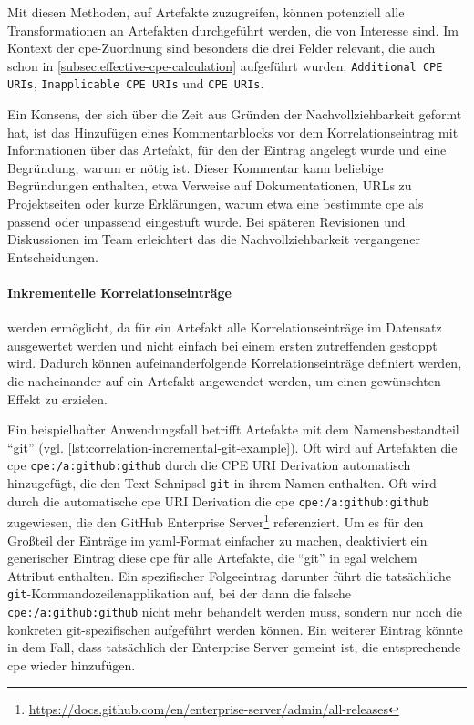 \bigskip

Mit diesen Methoden, auf Artefakte zuzugreifen, können potenziell alle Transformationen an Artefakten durchgeführt werden, die von Interesse sind.
Im Kontext der \acrshort{cpe}-Zuordnung sind besonders die drei Felder relevant, die auch schon in \autoref{subsec:effective-cpe-calculation} aufgeführt wurden:
\texttt{Additional CPE URIs}, \texttt{Inapplicable CPE URIs} und \texttt{CPE URIs}.

Ein Konsens, der sich über die Zeit aus Gründen der Nachvollziehbarkeit geformt hat, ist das Hinzufügen eines Kommentarblocks vor dem Korrelationseintrag mit Informationen über das Artefakt, für den der Eintrag angelegt wurde und eine Begründung, warum er nötig ist.
Dieser Kommentar kann beliebige Begründungen enthalten, etwa Verweise auf Dokumentationen, URLs zu Projektseiten oder kurze Erklärungen, warum etwa eine bestimmte \acrshort{cpe} als passend oder unpassend eingestuft wurde.
Bei späteren Revisionen und Diskussionen im Team erleichtert das die Nachvollziehbarkeit vergangener Entscheidungen.

\paragraph{Inkrementelle Korrelationseinträge}\label{par:incremental-correlation-entries}
werden ermöglicht, da für ein Artefakt alle Korrelationseinträge im Datensatz ausgewertet werden und nicht einfach bei einem ersten zutreffenden gestoppt wird.
Dadurch können aufeinanderfolgende Korrelationseinträge definiert werden, die nacheinander auf ein Artefakt angewendet werden, um einen gewünschten Effekt zu erzielen.

Ein beispielhafter Anwendungsfall betrifft Artefakte mit dem Namensbestandteil \enquote{git} (vgl. \autoref{lst:correlation-incremental-git-example}).
Oft wird auf Artefakten die \acrshort{cpe} \texttt{cpe:/a:github:github} durch die CPE URI Derivation automatisch hinzugefügt, die den Text-Schnipsel \texttt{git} in ihrem Namen enthalten.
Oft wird durch die automatische \acrshort{cpe} URI Derivation die \acrshort{cpe} \texttt{cpe:/a:github:github} zugewiesen, die den GitHub Enterprise Server\footnote{\url{https://docs.github.com/en/enterprise-server/admin/all-releases}} referenziert.
Um es für den Großteil der Einträge im \acrshort{yaml}-Format einfacher zu machen, deaktiviert ein generischer Eintrag diese \acrshort{cpe} für alle Artefakte, die \enquote{git} in egal welchem Attribut enthalten.
Ein spezifischer Folgeeintrag darunter führt die tatsächliche \texttt{git}-Kommandozeilenapplikation auf, bei der dann die falsche \texttt{cpe:/a:github:github} nicht mehr behandelt werden muss, sondern nur noch die konkreten git-spezifischen  aufgeführt werden können.
Ein weiterer Eintrag könnte in dem Fall, dass tatsächlich der Enterprise Server gemeint ist, die entsprechende \acrshort{cpe} wieder hinzufügen.

